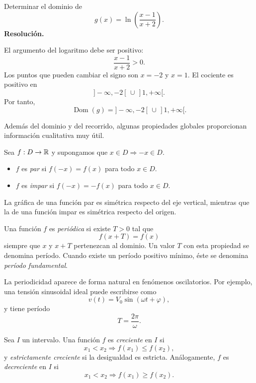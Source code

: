 \begin{solvedexercise}
Determinar el dominio de
\[
g(x)=\ln\!\left(\frac{x-1}{x+2}\right).
\]
\tcblower
\textbf{Resolución.}\par\smallskip
El argumento del logaritmo debe ser positivo:
\[
\frac{x-1}{x+2}>0.
\]
Los puntos que pueden cambiar el signo son $x=-2$ y $x=1$. El cociente es positivo en
\[
]-\infty,-2[\,\cup\,]1,+\infty[.
\]
Por tanto,
\[
\operatorname{Dom}(g)=]-\infty,-2[\,\cup\,]1,+\infty[.
\]
\end{solvedexercise}

Además del dominio y del recorrido, algunas propiedades globales proporcionan información cualitativa muy útil.

\begin{definition}[Paridad]
Sea $f:D\to\mathbb{R}$ y supongamos que $x\in D\Rightarrow -x\in D$.
\begin{itemize}
\item $f$ es \emph{par} si $f(-x)=f(x)$ para todo $x\in D$.
\item $f$ es \emph{impar} si $f(-x)=-f(x)$ para todo $x\in D$.
\end{itemize}
\end{definition}

La gráfica de una función par es simétrica respecto del eje vertical, mientras que la de una función impar es simétrica respecto del origen.

\begin{definition}[Periodicidad]
Una función $f$ es \emph{periódica} si existe $T>0$ tal que
\[
f(x+T)=f(x)
\]
siempre que $x$ y $x+T$ pertenezcan al dominio. Un valor $T$ con esta propiedad se denomina período. Cuando existe un período positivo mínimo, éste se denomina \emph{período fundamental}.
\end{definition}

La periodicidad aparece de forma natural en fenómenos oscilatorios. Por ejemplo, una tensión sinusoidal ideal puede escribirse como
\[
v(t)=V_0\sin(\omega t+\varphi),
\]
y tiene período
\[
T=\frac{2\pi}{\omega}.
\]

\begin{definition}[Monotonía]
Sea $I$ un intervalo. Una función $f$ es \emph{creciente} en $I$ si
\[
x_1<x_2\Longrightarrow f(x_1)\leq f(x_2),
\]
y \emph{estrictamente creciente} si la desigualdad es estricta. Análogamente, $f$ es \emph{decreciente} en $I$ si
\[
x_1<x_2\Longrightarrow f(x_1)\geq f(x_2).
\]
\end{definition}


